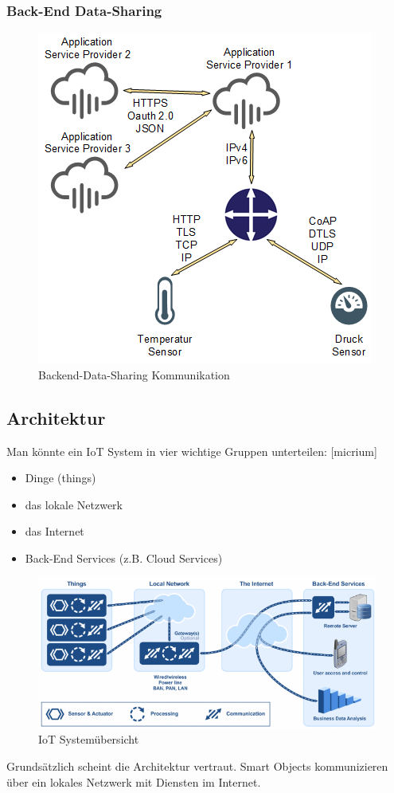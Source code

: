 \subsubsection{Back-End Data-Sharing}
\begin{figure}[H]
\centering
\includegraphics[scale=0.8]{images/backend-data-sharing.png}
\caption{Backend-Data-Sharing Kommunikation}
\end{figure}
\subsection{Architektur}
Man könnte ein IoT System in vier wichtige Gruppen unterteilen: [micrium]
\begin{itemize}
\item Dinge (things)
\item das lokale Netzwerk
\item das Internet
\item Back-End Services (z.B. Cloud Services)
\end{itemize}
\begin{figure}[H]
\centering
\includegraphics[scale=0.8]{images/iot_system_overview_by_micrium.PNG}
\caption{IoT Systemübersicht\cite{IoTOverview}}
\end{figure}
Grundsätzlich scheint die Architektur vertraut. Smart Objects kommunizieren über ein lokales Netzwerk mit Diensten im Internet.

